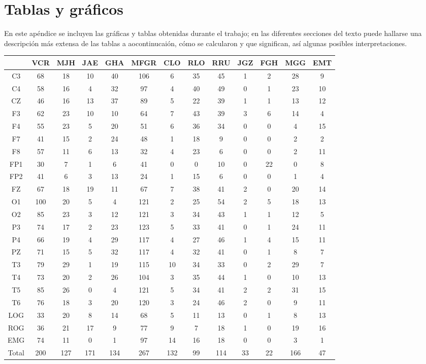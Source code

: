 \chapter{Tablas y gr\'aficos}

En este ap\'endice se incluyen las gr\'aficas y tablas obtenidas durante el trabajo; en las 
diferentes secciones del texto 
puede hallarse una descripci\'on m\'as extensa de las tablas a aocontinucai\'on, c\'omo se
calcularon y que significan, as\'i algunas posibles interpretaciones.


\begin{SidewaysFigure}
\centering
\begin{tabular}{c|ccccc|cccc|ccc}
& VCR & MJH & JAE & GHA & MFGR
& CLO & RLO & RRU & JGZ
& FGH & MGG & EMT \\
\hline
C3&68&18&10&40&106&6&35&45&1&2&28&9 \\
C4&58&16&4&32&97&4&40&49&0&1&23&10 \\
CZ&46&16&13&37&89&5&22&39&1&1&13&12 \\
F3&62&23&10&10&64&7&43&39&3&6&14&4 \\
F4&55&23&5&20&51&6&36&34&0&0&4&15 \\
F7&41&15&2&24&48&1&18&9&0&0&2&2 \\
F8&57&11&6&13&32&4&23&6&0&0&2&11 \\
FP1&30&7&1&6&41&0&0&10&0&22&0&8 \\
FP2&41&6&3&13&24&1&15&6&0&0&1&4 \\
FZ&67&18&19&11&67&7&38&41&2&0&20&14 \\
O1&100&20&5&4&121&2&25&54&2&5&18&13 \\
O2&85&23&3&12&121&3&34&43&1&1&12&5 \\
P3&74&17&2&23&123&5&33&41&0&1&24&11 \\
P4&66&19&4&29&117&4&27&46&1&4&15&11 \\
PZ&71&15&5&32&117&4&32&41&0&1&8&7 \\
T3&79&29&1&19&115&10&34&33&0&2&29&7 \\
T4&73&20&2&26&104&3&35&44&1&0&10&13 \\
T5&85&26&0&4&121&5&34&41&2&2&31&15 \\
T6&76&18&3&20&120&3&24&46&2&0&9&11 \\
LOG&33&20&8&14&68&5&11&13&0&1&8&13 \\
ROG&36&21&17&9&77&9&7&18&1&0&19&16 \\
EMG&74&11&0&1&97&14&16&18&0&0&3&1 \\
\hline
Total&200&127&171&134&267&132&99&114&33&22&166&47
\end{tabular}
\caption{Total de \'epocas PE clasificadas como sue\~no MOR 
(fase R) para cada
canal. %
}
\label{total_gpos_mor}
\end{SidewaysFigure}

